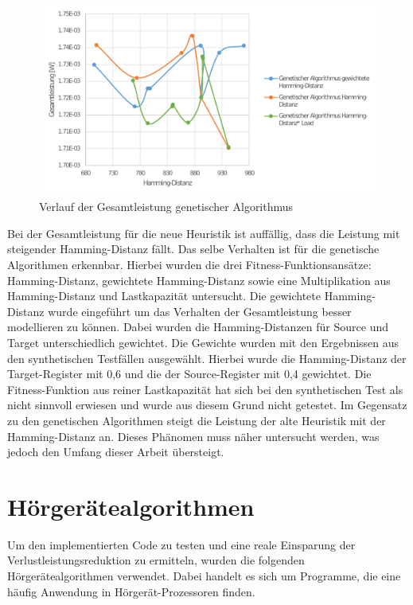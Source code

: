 \begin{figure}[H]
	\centering
	\includegraphics[width=\textwidth]{fig/totalpower_genetic.pdf}
	\caption{Verlauf der Gesamtleistung genetischer Algorithmus}
	\label{fig:totalpower_genetic}
\end{figure}

Bei der Gesamtleistung für die neue Heuristik ist auffällig, dass die Leistung mit steigender Hamming-Distanz fällt. Das selbe Verhalten ist für die genetische Algorithmen erkennbar. Hierbei wurden die drei Fitness-Funktionsans\"atze: Hamming-Distanz, gewichtete Hamming-Distanz sowie eine Multiplikation aus Hamming-Distanz und Lastkapazit\"at untersucht. Die gewichtete Hamming-Distanz wurde eingef\"uhrt um das Verhalten der Gesamtleistung besser modellieren zu k\"onnen. Dabei wurden die Hamming-Distanzen f\"ur Source und Target unterschiedlich gewichtet. Die Gewichte wurden mit den Ergebnissen aus den synthetischen Testf\"allen ausgew\"ahlt. Hierbei wurde die Hamming-Distanz der Target-Register mit 0,6 und die der Source-Register mit 0,4 gewichtet. Die Fitness-Funktion aus reiner Lastkapazit\"at hat sich bei den synthetischen Test als nicht sinnvoll erwiesen und wurde aus diesem Grund nicht getestet.
Im Gegensatz zu den genetischen Algorithmen steigt die Leistung der alte Heuristik mit der Hamming-Distanz an. Dieses Phänomen muss näher untersucht werden, was jedoch den Umfang dieser Arbeit übersteigt.

\section{Hörgerätealgorithmen}
\label{sec:testprogamme}
Um den implementierten Code zu testen und eine reale Einsparung der Verlustleistungsreduktion zu ermitteln, wurden die folgenden Hörgerätealgorithmen verwendet. Dabei handelt es sich um Programme, die eine häufig Anwendung in Hörgerät-Prozessoren finden.

